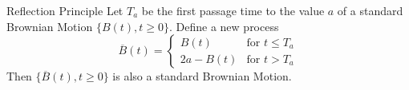 \documentclass[letterpaper]{beamer}
\begin{document}
\begin{frame}{Reflection Principle}
Let $T_a$ be the first passage time to the value $a$ of a standard Brownian Motion $\{B(t),t\ge 0\}$.
Define a new process
$$
\overline{B}(t)=
\begin{cases}
B(t) &\text{for } t\le T_a\\
2a-B(t) &\text{for } t> T_a
\end{cases}
$$
Then $\{\overline{B}(t),t\ge 0\}$ is also a standard Brownian Motion.

\begin{center}
%
\end{center}

\end{frame}
\end{document}
